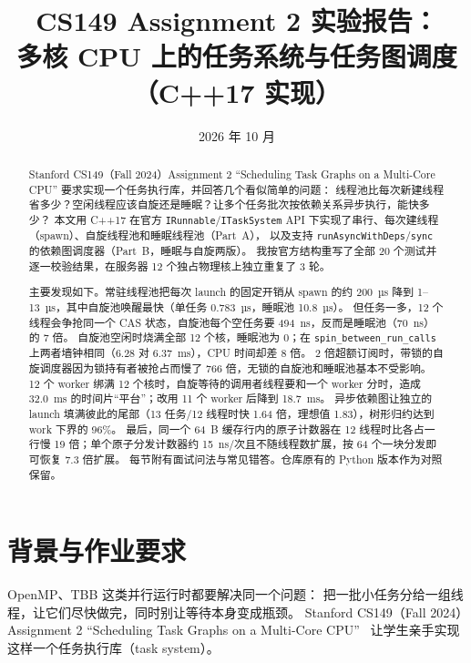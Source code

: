 \documentclass[11pt,a4paper]{ctexart}
\title{CS149 Assignment 2 实验报告：\\多核 CPU 上的任务系统与任务图调度（C++17 实现）}
\author{\authorline}
\date{2026 年 10 月}
\begin{document}
\maketitle

\begin{abstract}
Stanford CS149（Fall 2024）Assignment 2 ``Scheduling Task Graphs on a Multi-Core CPU'' 要求实现一个任务执行库，并回答几个看似简单的问题：
线程池比每次新建线程省多少？空闲线程应该自旋还是睡眠？让多个任务批次按依赖关系异步执行，能快多少？
本文用 C++17 在官方 \texttt{IRunnable}/\texttt{ITaskSystem} API 下实现了串行、每次建线程（spawn）、自旋线程池和睡眠线程池（Part~A），
以及支持 \texttt{runAsyncWithDeps}/\texttt{sync} 的依赖图调度器（Part~B，睡眠与自旋两版）。
我按官方结构重写了全部 20 个测试并逐一校验结果，在服务器 12 个独占物理核上独立重复了 3 轮。

主要发现如下。常驻线程池把每次 launch 的固定开销从 spawn 的约 200~µs 降到 1--13~µs，其中自旋池唤醒最快（单任务 0.783~µs，睡眠池 10.8~µs）。
但任务一多，12 个线程会争抢同一个 CAS 状态，自旋池每个空任务要 494~ns，反而是睡眠池（70~ns）的 7 倍。
自旋池空闲时烧满全部 12 个核，睡眠池为 0；在 \texttt{spin\_\allowbreak{}between\_\allowbreak{}run\_\allowbreak{}calls} 上两者墙钟相同（6.28 对 6.37~ms），CPU 时间却差 8 倍。
2 倍超额订阅时，带锁的自旋调度器因为锁持有者被抢占而慢了 766 倍，无锁的自旋池和睡眠池基本不受影响。
12 个 worker 绑满 12 个核时，自旋等待的调用者线程要和一个 worker 分时，造成 32.0~ms 的时间片``平台''；改用 11 个 worker 后降到 18.7~ms。
异步依赖图让独立的 launch 填满彼此的尾部（13 任务/12 线程时快 1.64 倍，理想值 1.83），树形归约达到 work 下界的 96\%。
最后，同一个 64~B 缓存行内的原子计数器在 12 线程时比各占一行慢 19 倍；单个原子分发计数器约 15~ns/次且不随线程数扩展，按 64 个一块分发即可恢复 7.3 倍扩展。
每节附有面试问法与常见错答。仓库原有的 Python 版本作为对照保留。
\end{abstract}

\tableofcontents
\newpage

\section{背景与作业要求}
\label{sec:intro}

OpenMP、TBB 这类并行运行时都要解决同一个问题：
把一批小任务分给一组线程，让它们尽快做完，同时别让等待本身变成瓶颈。
Stanford CS149（Fall 2024）Assignment 2 ``Scheduling Task Graphs on a Multi-Core CPU''~\cite{cs149} 让学生亲手实现这样一个任务执行库（task system）。
\end{document}
